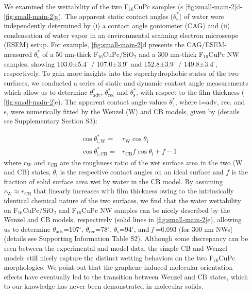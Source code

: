 We examined the wettability of the two F\(_{\text{16}}\)CuPc samples (s
\autoref{fig:small-main-2}d-\autoref{fig:small-main-2}g). The apparent static contact
angles (\(\theta_{\mathrm{s}}^{*}\)) of water were independently
determined by (i) a contact angle goniometer (CAG) and (ii) condensation
of  water vapor in an environmental scanning electron
microscope (ESEM) setup. For example,  \autoref{fig:small-main-2}d
presents the CAG/ESEM-measured \(\theta_{\mathrm{s}}^{*}\) of a 50 nm-thick
F\(_{\text{16}}\)CuPc/SiO\(_{\text{2}}\) and a 300 nm-thick F\(_{\text{16}}\)CuPc NW samples, showing
103.0\(\pm\)5.4\(^{\circ}\) / 107.0\(\pm\)3.9\(^{\circ}\) and
152.8\(\pm\)3.9\(^{\circ}\) / 149.8\(\pm\)3.4\(^{\circ}\),
respectively. To gain more insights into the superhydrophobic states
of the two surfaces, we conducted a series of static and dynamic
contact angle measurements which allow us to determine
\(\theta_{\mathrm{adv}}^{*}\), \(\theta_{\mathrm{rec}}^{*}\) and
\(\theta_{\mathrm{s}}^{*}\), with respect to the film thickness (
\autoref{fig:small-main-2}e). The apparent contact angle values
\(\theta_{\mathrm{i}}^{*}\), where i=adv, rec, and s, were numerically
fitted by the Wenzel (W) \cite{Wenzel_1936_wetting} and CB \cite{Cassie_1944_wet}
models, given by (details see Supplementary Section S3):

\begin{eqnarray}
\label{eq:small-2}
&\cos \theta^{*}_{\mathrm{i,W}} =& r_{\mathrm{W}} \cos \theta_{\mathrm{i}} \\
&\cos \theta^{*}_{\mathrm{i,CB}} =& r_{\mathrm{CB}} f \cos \theta_{\mathrm{i}} + f - 1
\end{eqnarray}
where \(r_{\mathrm{W}}\) and \(r_{\mathrm{CB}}\) are the roughness ratio
of the wet surface area in the two (W and CB) states,
\(\theta_{\mathrm{i}}\) is the respective contact angles on an ideal
surface and \(f\) is the fraction of solid surface area wet by water in
the CB model. By assuming \(r_{\mathrm{W}} \approx r_{\mathrm{CB}}\)
that linearly increases with film thickness owing to the
intrinsically identical chemical nature of the two surfaces, we find
that the water wettability on F\(_{\text{16}}\)CuPc/SiO\(_{\text{2}}\) and F\(_{\text{16}}\)CuPc NW
samples can be nicely described by the Wenzel and CB models,
respectively (solid lines in  \autoref{fig:small-main-2}e), allowing us to
determine \(\theta_{\mathrm{adv}}\)=107\(^{\circ}\),
\(\theta_{\mathrm{rec}}\)=78\(^{\circ}\),
\(\theta_{\mathrm{s}}\)=94\(^{\circ}\), and \emph{f} =0.093 (for 300 nm
NWs) (details see Supporting Information Table S2).  Although some discrepancy
can be seen between the experimental and model data, the simple CB
and Wenzel models still nicely capture the distinct wetting behaviors
on the two F\(_{\text{16}}\)CuPc morphologies. We point out that the
graphene-induced molecular orientation effects have eventually led to
the transition between Wenzel and CB states, which to our knowledge
has never been demonstrated in molecular solids.


